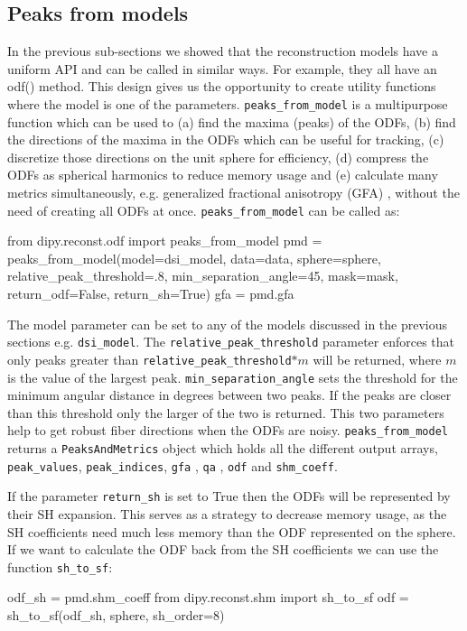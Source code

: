 \documentclass{bioinfo}
\begin{document}
\subsection{Peaks from models}
In the previous sub-sections we showed that the reconstruction models have a
uniform API and can be called in similar ways. For example, they all have an
odf() method. This design gives us the opportunity to create utility functions
where the model is one of the parameters. \texttt{peaks\_from\_model} is a
multipurpose function which can be used to (a) find the maxima (peaks) of the
ODFs, (b) find the directions of the maxima in the ODFs which can be useful for
tracking, (c) discretize those directions on the unit sphere for efficiency, (d)
compress the ODFs as spherical harmonics to reduce memory usage and (e)
calculate many metrics simultaneously, e.g. generalized fractional anisotropy
(GFA) \citep{tuch:04}, without the need of creating all ODFs at
once. \texttt{peaks\_from\_model} can be called as:
\begin{python}
from dipy.reconst.odf import peaks_from_model
pmd = peaks_from_model(model=dsi_model,
                       data=data,
                       sphere=sphere,
                       relative_peak_threshold=.8,
                       min_separation_angle=45,
                       mask=mask,
                       return_odf=False,
                       return_sh=True)
gfa = pmd.gfa
\end{python}
The model parameter can be set to any of the models discussed in the previous sections
e.g. \texttt{dsi\_model}. The \texttt{relative\_peak\_threshold} parameter
enforces that only peaks greater than \texttt{relative\_peak\_threshold}$*m$
will be returned, where $m$ is the value of the largest
peak. \texttt{min\_separation\_angle} sets the threshold for the minimum
angular distance in degrees between two peaks. If the peaks are closer than
this threshold only the larger of the two is returned. This two parameters help
to get robust fiber directions when the ODFs are
noisy. \texttt{peaks\_from\_model} returns a \texttt{PeaksAndMetrics} object
which holds all the different output arrays, \texttt{peak\_values},
\texttt{peak\_indices}, \texttt{gfa} , \texttt{qa}
\citep{yeh-etal:10}, \texttt{odf} and \texttt{shm\_coeff}.

If the parameter \texttt{return\_sh} is set to True then the ODFs will be
represented by their SH expansion. This serves as a strategy to decrease
memory usage, as the SH coefficients need much less memory than the ODF represented
on the sphere. If we want to calculate the ODF back from the SH coefficients we
can use the function \texttt{sh\_to\_sf}:
\begin{python}
odf_sh = pmd.shm_coeff
from dipy.reconst.shm import sh_to_sf
odf = sh_to_sf(odf_sh, sphere, sh_order=8)
\end{python}
\end{document}
